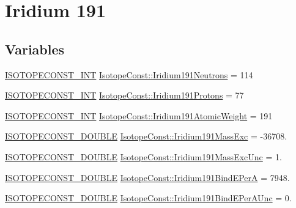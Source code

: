 \hypertarget{group___isotope_const-_iridium-_ir191}{}\section{Iridium 191}
\label{group___isotope_const-_iridium-_ir191}
\subsection*{Variables}
\begin{DoxyCompactItemize}
\item 
\mbox{\hyperlink{group___isotope_const-_macros_ga5f18360b3e99483a35c32d789e62621c}{I\+S\+O\+T\+O\+P\+E\+C\+O\+N\+S\+T\+\_\+\+I\+NT}} \mbox{\hyperlink{group___isotope_const-_iridium-_ir191_ga7d2fb93c48fad814adfd3ad1a91e26eb}{Isotope\+Const\+::\+Iridium191\+Neutrons}} = 114
\item 
\mbox{\hyperlink{group___isotope_const-_macros_ga5f18360b3e99483a35c32d789e62621c}{I\+S\+O\+T\+O\+P\+E\+C\+O\+N\+S\+T\+\_\+\+I\+NT}} \mbox{\hyperlink{group___isotope_const-_iridium-_ir191_gab024d3a2e94d1ffbdf79873407e2c7a2}{Isotope\+Const\+::\+Iridium191\+Protons}} = 77
\item 
\mbox{\hyperlink{group___isotope_const-_macros_ga5f18360b3e99483a35c32d789e62621c}{I\+S\+O\+T\+O\+P\+E\+C\+O\+N\+S\+T\+\_\+\+I\+NT}} \mbox{\hyperlink{group___isotope_const-_iridium-_ir191_ga0ca2dc01f22be45c900d346b69a9a057}{Isotope\+Const\+::\+Iridium191\+Atomic\+Weight}} = 191
\item 
\mbox{\hyperlink{group___isotope_const-_macros_ga8f45a7272ce02c0b4c65c44636ed719a}{I\+S\+O\+T\+O\+P\+E\+C\+O\+N\+S\+T\+\_\+\+D\+O\+U\+B\+LE}} \mbox{\hyperlink{group___isotope_const-_iridium-_ir191_gad478e00ab70990378d5dff03d1c8b153}{Isotope\+Const\+::\+Iridium191\+Mass\+Exc}} = -\/36708.
\item 
\mbox{\hyperlink{group___isotope_const-_macros_ga8f45a7272ce02c0b4c65c44636ed719a}{I\+S\+O\+T\+O\+P\+E\+C\+O\+N\+S\+T\+\_\+\+D\+O\+U\+B\+LE}} \mbox{\hyperlink{group___isotope_const-_iridium-_ir191_ga99f4422ca7e7aeca0e040a9905c0404b}{Isotope\+Const\+::\+Iridium191\+Mass\+Exc\+Unc}} = 1.
\item 
\mbox{\hyperlink{group___isotope_const-_macros_ga8f45a7272ce02c0b4c65c44636ed719a}{I\+S\+O\+T\+O\+P\+E\+C\+O\+N\+S\+T\+\_\+\+D\+O\+U\+B\+LE}} \mbox{\hyperlink{group___isotope_const-_iridium-_ir191_ga05b1a2e149039fdc80d2dcb1abcae6f0}{Isotope\+Const\+::\+Iridium191\+Bind\+E\+PerA}} = 7948.
\item 
\mbox{\hyperlink{group___isotope_const-_macros_ga8f45a7272ce02c0b4c65c44636ed719a}{I\+S\+O\+T\+O\+P\+E\+C\+O\+N\+S\+T\+\_\+\+D\+O\+U\+B\+LE}} \mbox{\hyperlink{group___isotope_const-_iridium-_ir191_ga13c91d10465366b5f815a99bd952ba54}{Isotope\+Const\+::\+Iridium191\+Bind\+E\+Per\+A\+Unc}} = 0.

\end{DoxyCompactItemize}
